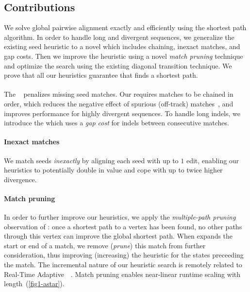 \subsection{Contributions} \label{sec:contributions}

We solve global pairwise alignment exactly and efficiently using the \A shortest
path algorithm. In order to handle long and divergent sequences, we generalize
the existing seed heuristic to a novel \csh which includes chaining, inexact
matches, and gap costs. Then we improve the heuristic using a novel \emph{match
pruning} technique and optimize the \A search using the existing diagonal
transition technique. We prove that all our heuristics guarantee that \A finds a
shortest path.

\paragraph{\Csh} The \emph{\sh}~\citep{ivanov2022fast} penalizes missing seed
matches. Our \csh requires matches to be chained in order, which reduces the
negative effect of spurious (off-track)
matches~\citep{wilbur1984context,benson2016lcsk}, and improves performance for
highly divergent sequences. To handle long indels, we introduce the \emph{\gch}
which uses a \emph{gap cost} for indels between consecutive matches.

\paragraph{Inexact matches} We match seeds \emph{inexactly} by aligning each
seed with up to $1$ edit, enabling our heuristics to potentially double in value and
cope with up to twice higher divergence.

\paragraph{Match pruning}
In order to further improve our heuristics, we apply the \emph{multiple-path pruning}
observation of \citet{poole2017artificial}: once a shortest path to a vertex has
been found, no other paths through this vertex can improve the global shortest
path. When \A expands the start or end of a match, we remove (\emph{prune}) this
match from further consideration, thus improving (increasing) the heuristic for
the states preceeding the match. The incremental nature of our heuristic search is
remotely related to Real-Time Adaptive~\A~\citep{koenig2006real}. Match pruning
enables near-linear runtime scaling with length~(\cref{fig1-astar}).

